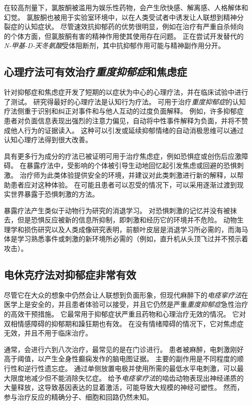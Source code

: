 在较高剂量下，氯胺酮被滥用为娱乐性药物，会产生欣快感、解离感、人格解体和幻觉。
氯胺酮也被用于实验室环境中，以在人类受试者中诱发让人联想到精神分裂症的认知症状。
尽管速效抗抑郁药的优势很明显，例如在治疗有严重自杀倾向的个体方面，但氯胺酮有害的精神作用使其使用存在问题。
正在尝试开发替代的\textit{N-甲基-D-天冬氨酸}受体阻断剂，其中抗抑郁作用可能与精神副作用分开。



\subsection{心理疗法可有效治疗\textit{重度抑郁症}和焦虑症}

针对抑郁症和焦虑症开发了短期的以症状为中心的心理疗法，并在临床试验中进行了测试。
研究得最好的心理疗法是认知行为疗法。
可用于治疗\textit{重度抑郁症}的认知疗法侧重于识别和纠正对事件和与他人互动的过度负面解释。
例如，许多抑郁症患者对负面信息表现出强烈的注意力偏见，自动将中性事件解释为负面，并将不赞成他人行为的证据读入。
这种可以引发或延续抑郁情绪的自动消极思维可以通过认知心理疗法得到很大改善。


具有更多行为成分的疗法已被证明可用于治疗焦虑症，例如恐惧症或创伤后应激障碍。
在暴露疗法中，受影响的个体被引导生动地回忆起引发焦虑或回避的恐惧刺激。
治疗师为此类体验提供安全的环境，并建议对此类刺激进行新的解释，以帮助患者应对这种体验。
在可能且患者可以忍受的情况下，可以采用逐渐过渡到现实世界暴露于恐惧刺激的方法。


暴露疗法产生类似于动物行为研究的消退学习。
对恐惧刺激的记忆并没有被抹去，但是恐惧反应被新的信息所抑制，即刺激和经历它的环境并不危险。
动物生理学和损伤研究以及人类成像研究表明，前额叶皮层是消退学习所必需的，而海马体是学习熟悉事件或刺激的新环境所必需的（例如，直升机从头顶飞过并不预示着攻击）。



\subsection{电休克疗法对抑郁症非常有效}

尽管它在大众的想象中仍然会让人联想到负面形象，但现代麻醉下的\textit{电痉挛疗法}在医学上是安全的，并且患者体验可以接受，并且它仍然是严重\textit{重度抑郁症}急性治疗的高效干预措施。
它最常用于抑郁症状严重且药物和心理治疗无效的情况。
它对双相情感障碍的抑郁期和躁狂期也有效。
在没有情绪障碍的情况下，它对焦虑症无效，并且不用于临床治疗。


通常，会进行六到八次治疗，最常见的是在门诊进行。
患者被麻醉，电刺激刚好高于阈值，以产生全身性癫痫发作的脑电图证据。
主要的副作用是不同程度的顺行性和逆行性遗忘症。
通过单侧放置电极并使用所需的最低水平电刺激，可以最大限度地减少但不能消除失忆症。
给予\textit{电痉挛疗法}的啮齿动物表现出神经递质的大量释放，这导致基因表达的显着激活，可能导致大规模的神经可塑性。
然而，参与治疗反应的精确分子、细胞和回路仍然未知。



